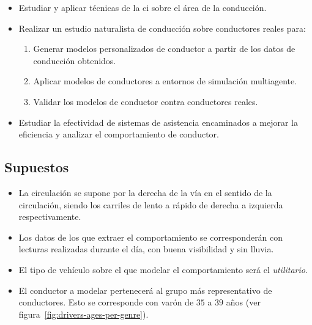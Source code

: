 \begin{itemize}
	\item Estudiar y aplicar técnicas de la \ac{ci} sobre el área de la conducción.
	\item Realizar un estudio naturalista de conducción sobre conductores reales para:
	\begin{enumerate}
		\item Generar modelos personalizados de conductor a partir de los datos de conducción obtenidos.
		\item Aplicar modelos de conductores a entornos de simulación multiagente.
		\item Validar los modelos de conductor contra conductores reales.
	\end{enumerate}
	\item Estudiar la efectividad de sistemas de asistencia encaminados a mejorar la eficiencia y analizar el comportamiento de conductor.
\end{itemize}

\subsection{Supuestos}

\begin{itemize}
	\item La circulación se supone por la derecha de la vía en el sentido de la circulación, siendo los carriles de lento a rápido de derecha a izquierda respectivamente.
	\item Los datos de los que extraer el comportamiento se corresponderán con lecturas realizadas durante el día, con buena visibilidad y sin lluvia.
	\item El tipo de vehículo sobre el que modelar el comportamiento será el \textit{utilitario}.
	\item El conductor a modelar pertenecerá al grupo más representativo de conductores. Esto se corresponde con varón de $35$ a $39$ años (ver figura~\ref{fig:drivers-ages-per-genre}).
\end{itemize}

